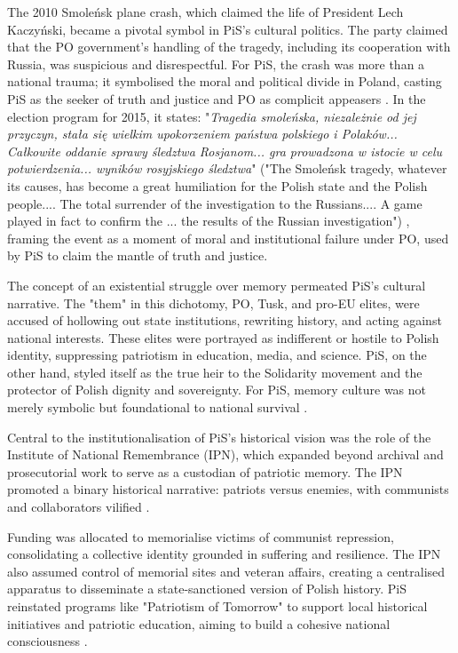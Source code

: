 The 2010 Smoleńsk plane crash, which claimed the life of President Lech Kaczyński, became a pivotal symbol in PiS's cultural politics. The party claimed that the PO government's handling of the tragedy, including its cooperation with Russia, was suspicious and disrespectful. For PiS, the crash was more than a national trauma; it symbolised the moral and political divide in Poland, casting PiS as the seeker of truth and justice and PO as complicit appeasers \citep{pis_program_2014}. In the election program for 2015, it states: "\textit{Tragedia smoleńska, niezależnie od jej przyczyn, stała się wielkim upokorzeniem państwa polskiego i Polaków... Całkowite oddanie sprawy śledztwa Rosjanom... gra prowadzona w istocie w celu potwierdzenia... wyników rosyjskiego śledztwa}" ("The Smoleńsk  tragedy, whatever its causes, has become a great humiliation for the Polish state and the Polish people.... The total surrender of the investigation to the Russians.... A game played in fact to confirm the ... the results of the Russian investigation") \citep{pis_program_2014},  framing the event as a moment of moral and institutional failure under PO, used by PiS to claim the mantle of truth and justice.

The concept of an existential struggle over memory permeated PiS's cultural narrative. The "them" in this dichotomy, PO, Tusk, and pro-EU elites, were accused of hollowing out state institutions, rewriting history, and acting against national interests. These elites were portrayed as indifferent or hostile to Polish identity, suppressing patriotism in education, media, and science. PiS, on the other hand, styled itself as the true heir to the Solidarity movement and the protector of Polish dignity and sovereignty. For PiS, memory culture was not merely symbolic but foundational to national survival \citep{pis_program_2014}.

Central to the institutionalisation of PiS's historical vision was the role of the Institute of National Remembrance (IPN), which expanded beyond archival and prosecutorial work to serve as a custodian of patriotic memory. The IPN promoted a binary historical narrative: patriots versus enemies, with communists and collaborators vilified \citep{pis_program_2014}.

Funding was allocated to memorialise victims of communist repression, consolidating a collective identity grounded in suffering and resilience. The IPN also assumed control of memorial sites and veteran affairs, creating a centralised apparatus to disseminate a state-sanctioned version of Polish history. PiS reinstated programs like "Patriotism of Tomorrow" to support local historical initiatives and patriotic education, aiming to build a cohesive national consciousness \citep{pis_program_2014}.

